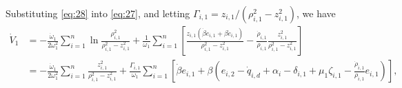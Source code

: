 \documentclass[pdflatex,sn-mathphys-num]{sn-jnl}%
\theoremstyle{thmstyleone}%
\theoremstyle{thmstyletwo}%
\theoremstyle{thmstylethree}%
\begin{document}
	Substituting \cref{eq:28} into \cref{eq:27}, and letting $\varGamma_{i,1} = {z_{i,1}}/({\rho_{i,1}^2 - z_{i,1}^2})$, we have
	\begin{equation}	\label{eq:29}
			\begin{aligned}
			\dot{V}_{1} &= -\frac{\dot{\omega}_{1}}{2 \omega_{1}^{2}}\sum_{i=1}^{n}\ln\frac{\rho_{i,1}^{2}}{\rho_{i,1}^{2}-z_{i,1}^{2}}+\frac{1}{\omega_{1}}\sum_{i=1}^{n} \left[ \frac{z_{i,1} (\dot{\beta} e_{i,1} + \beta \dot{e}_{i,1})}{\rho_{i,1}^{2} - z_{i,1}^{2}} - \frac{\dot{\rho}_{i,1}}{\rho_{i,1}} \frac{z_{i,1}^{2}}{\rho_{i,1}^{2} - z_{i,1}^{2}} \right] \\
			&=-\frac{\dot{\omega}_{1}}{2 \omega_{1}^{2}}\sum_{i=1}^{n}\frac{z_{i,1}^{2}}{\rho_{i,1}^{2}-z_{i,1}^{2}}+\frac{\varGamma_{i,1}}{\omega_{1}}\sum_{i=1}^{n} \left[\dot{\beta} e_{i,1}+\beta \left(e_{i,2}-\dot q_{i,d}+\alpha_{i}-\delta_{i,1}+\mu_1 \zeta_{i,1}- \frac{\dot{\rho}_{i,1}}{\rho_{i,1}}e_{i,1}\right)  \right],
		\end{aligned}
			\end{equation}
\end{document}
